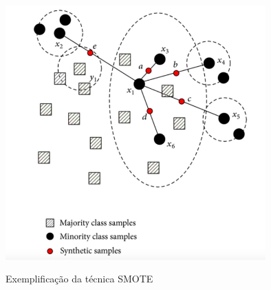 \documentclass{article}
\begin{document}
\begin{figure}[h]
\caption{Exemplificação da técnica SMOTE}

\centering %
\includegraphics[width=10cm]{images/SMOTE-img.png} %
\label{figura:smote}
\end{figure}
\end{document}
